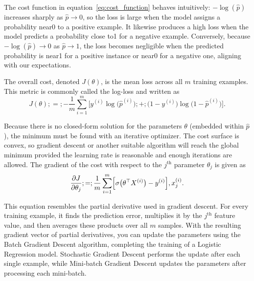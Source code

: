 \documentclass[12pt,letter]{article}
\begin{document}
The cost function in equation~\ref{eq:cost_function} behaves intuitively: $-\log(\hat{p})$ increases sharply as $\hat{p} \to 0$, so the loss is large when the model assigns a probability near0 to a positive example. It likewise produces a high loss when the model predicts a probability close to1 for a negative example. Conversely, because $-\log(\hat{p})\to0$ as $\hat{p} \to 1$, the loss becomes negligible when the predicted probability is near1 for a positive instance or near0 for a negative one, aligning with our expectations.



The overall cost, denoted $J(\theta)$, is the mean loss across all $m$ training examples. This metric is commonly called the log-loss and written as 
\begin{equation}
J(\theta) ;=; -\frac{1}{m}\sum_{i=1}^{m}\Big[y^{(i)} \log \bigl(\hat{p}^{(i)}\bigr) ;+; \bigl(1 - y^{(i)}\bigr) \log \bigl(1-\hat{p}^{(i)}\bigr)\Big].
\label{eq:log_loss}
\end{equation}

Because there is no closed-form solution for the parameters $\theta$ (embedded within $\hat{p}$), the minimum must be found with an iterative optimizer. The cost surface is convex, so gradient descent or another suitable algorithm will reach the global minimum provided the learning rate is reasonable and enough iterations are allowed. The gradient of the cost with respect to the $j^\text{th}$ parameter $\theta_j$ is given as
\begin{equation}
\frac{\partial J}{\partial \theta_j} ;=; \frac{1}{m} \sum_{i=1}^{m} \Bigl[\sigma \bigl(\theta^{\top}X^{(i)}\bigr) - y^{(i)}\Bigr],x^{(i)}_{j}.
\label{eq:Logistic_cost_function_partial_derivatives}
\end{equation}


This equation resembles the partial derivative used in gradient descent. For every training example, it finds the prediction error, multiplies it by the $j^\text{th}$ feature value, and then averages these products over all $m$ samples. With the resulting gradient vector of partial derivatives, you can update the parameters using the Batch Gradient Descent algorithm, completing the training of a Logistic Regression model. Stochastic Gradient Descent performs the update after each single example, while Mini-batch Gradient Descent updates the parameters after processing each mini-batch.
\end{document}
